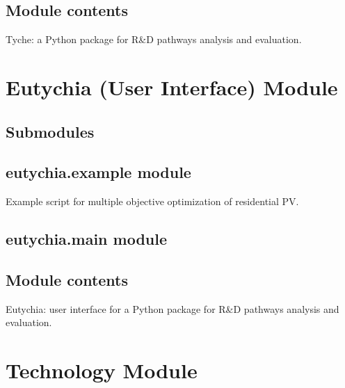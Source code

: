 \documentclass[letterpaper,10pt,english]{sphinxmanual}
\begin{document}
\subsection{Module contents}
\label{\detokenize{tyche:module-tyche}}\label{\detokenize{tyche:module-contents}}
Tyche: a Python package for R\&D pathways analysis and evaluation.


\section{Eutychia (User Interface) Module}
\label{\detokenize{eutychia:eutychia-user-interface-module}}\label{\detokenize{eutychia::doc}}

\subsection{Submodules}
\label{\detokenize{eutychia:submodules}}

\subsection{eutychia.example module}
\label{\detokenize{eutychia:module-eutychia.example}}\label{\detokenize{eutychia:eutychia-example-module}}
Example script for multiple objective optimization of residential PV.


\subsection{eutychia.main module}
\label{\detokenize{eutychia:eutychia-main-module}}

\subsection{Module contents}
\label{\detokenize{eutychia:module-eutychia}}\label{\detokenize{eutychia:module-contents}}
Eutychia: user interface for a Python package for R\&D pathways analysis and evaluation.


\section{Technology Module}
\label{\detokenize{technology:technology-module}}\label{\detokenize{technology:sec-technologymodule}}\label{\detokenize{technology::doc}}
\end{document}
